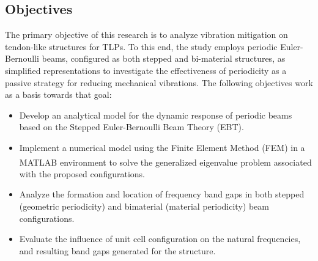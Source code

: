 \subsection{Objectives}

The primary objective of this research is to analyze vibration mitigation on tendon-like structures for TLPs. To this end, the study employs periodic Euler-Bernoulli beams, configured as both stepped and bi-material structures, as simplified representations to investigate the effectiveness of periodicity as a passive strategy for reducing mechanical vibrations. The following objectives work as a basis towards that goal:

\begin{itemize}
    \item[\blacktriangleright] Develop an analytical model for the dynamic response of periodic beams based on the Stepped Euler-Bernoulli Beam Theory (EBT).
    \item[\blacktriangleright] Implement a numerical model using the Finite Element Method (FEM) in a MATLAB\textsuperscript{\textregistered} environment to solve the generalized eigenvalue problem associated with the proposed configurations.
    \item[\blacktriangleright] Analyze the formation and location of frequency band gaps in both stepped (geometric periodicity) and bimaterial (material periodicity) beam configurations.
    \item[\blacktriangleright] Evaluate the influence of unit cell configuration on the natural frequencies, and resulting band gaps generated for the structure.
\end{itemize}
